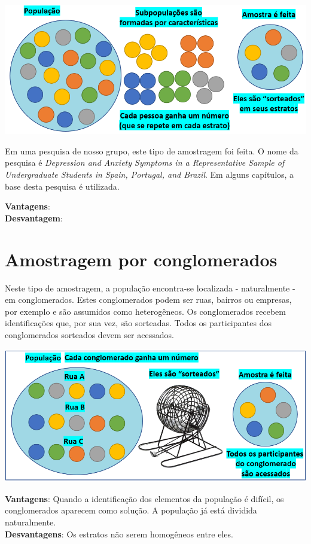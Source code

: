\documentclass[
]{book}
\begin{document}
\includegraphics{./img/cap_a_estratificada.png}

Em uma pesquisa de nosso grupo, este tipo de amostragem foi feita. O nome da pesquisa é \emph{Depression and Anxiety Symptoms in a Representative Sample
of Undergraduate Students in Spain, Portugal, and Brazil}. Em alguns capítulos, a base desta pesquisa é utilizada.

\textbf{Vantagens}:\\
\textbf{Desvantagem}:

\hypertarget{amostragem-por-conglomerados}{%
\section{Amostragem por conglomerados}\label{amostragem-por-conglomerados}}

Neste tipo de amostragem, a população encontra-se localizada - naturalmente - em conglomerados. Estes conglomerados podem ser ruas, bairros ou empresas, por exemplo e são assumidos como heterogêneos. Os conglomerados recebem identificações que, por sua vez, são sorteadas. Todos os participantes dos conglomerados sorteados devem ser acessados.

\includegraphics{./img/cap_a_conglomerado.png}

\textbf{Vantagens}: Quando a identificação dos elementos da população é difícil, os conglomerados aparecem como solução. A população já está dividida naturalmente.\\
\textbf{Desvantagens}: Os estratos não serem homogêneos entre eles.
\end{document}
